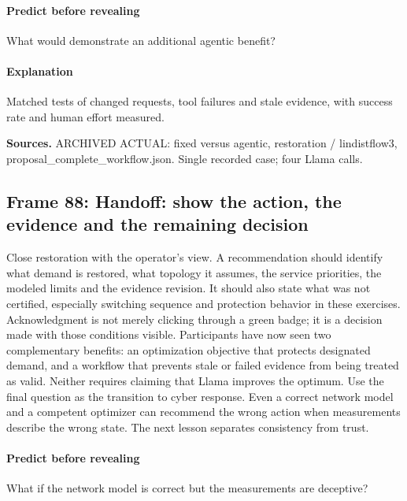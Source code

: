 \documentclass[11pt]{article}
\begin{document}
\paragraph{Predict before revealing}What would demonstrate an additional agentic benefit?
\paragraph{Explanation}Matched tests of changed requests, tool failures and stale evidence, with success rate and human effort measured.
\par\nopagebreak\begin{minipage}{\linewidth}{\footnotesize\color{slate}\textbf{Sources.} ARCHIVED ACTUAL: fixed versus agentic, restoration / lindistflow3, proposal\_complete\_workflow.json. Single recorded case; four Llama calls.\par}\end{minipage}\par\medskip
\subsection*{Frame 88: Handoff: show the action, the evidence and the remaining decision}
Close restoration with the operator's view. A recommendation should identify what demand is restored, what topology it assumes, the service priorities, the modeled limits and the evidence revision. It should also state what was not certified, especially switching sequence and protection behavior in these exercises. Acknowledgment is not merely clicking through a green badge; it is a decision made with those conditions visible. Participants have now seen two complementary benefits: an optimization objective that protects designated demand, and a workflow that prevents stale or failed evidence from being treated as valid. Neither requires claiming that Llama improves the optimum. Use the final question as the transition to cyber response. Even a correct network model and a competent optimizer can recommend the wrong action when measurements describe the wrong state. The next lesson separates consistency from trust.\par
\paragraph{Predict before revealing}What if the network model is correct but the measurements are deceptive?
\end{document}
